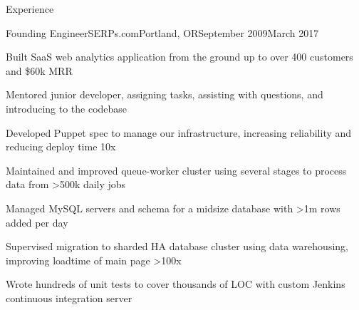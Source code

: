 \documentclass[letterpaper,10pt]{article}
\begin{document}
\begin{rsection}{Experience}
\begin{rexperienceitem}{Founding Engineer}{SERPs.com}{Portland, OR}{September 2009}{March 2017}
  \item Built SaaS web analytics application from the ground up to over 400 customers and \$60k MRR
  \item Mentored junior developer, assigning tasks, assisting with questions, and introducing to the codebase
  \item Developed Puppet spec to manage our infrastructure, increasing reliability and reducing deploy time 10x
  \item Maintained and improved queue-worker cluster using several stages to process data from \textgreater500k daily jobs
  \item Managed MySQL servers and schema for a midsize database with \textgreater1m rows added per day
  \item Supervised migration to sharded HA database cluster using data warehousing,
        improving loadtime of main page \textgreater100x
  \item Wrote hundreds of unit tests to cover thousands of LOC with custom Jenkins continuous integration server
\end{rexperienceitem}
\end{rsection}
\end{document}

